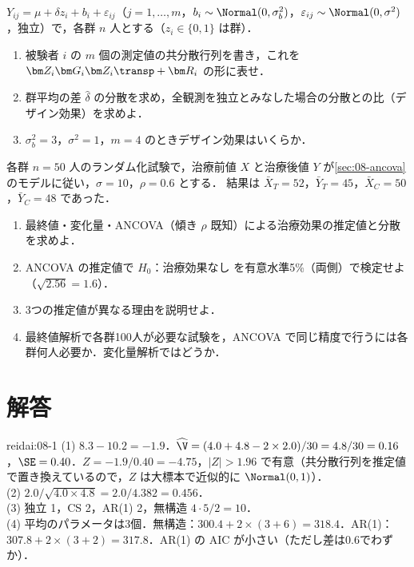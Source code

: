 \begin{reidai}[変量切片モデル]\label{reidai:08-2}
$Y_{ij}=\mu+\delta z_i+b_i+\varepsilon_{ij}$（$j=1,\dots,m$，$b_i\sim\Normal(0,\sigma_b^2)$，$\varepsilon_{ij}\sim\Normal(0,\sigma^2)$，独立）で，各群 $n$ 人とする（$z_i\in\{0,1\}$ は群）．
\begin{enumerate}[label=(\arabic*)]
\item 被験者 $i$ の $m$ 個の測定値の共分散行列を書き，これを $\bm Z_i\bm G_i\bm Z_i\transp+\bm R_i$ の形に表せ．
\item 群平均の差 $\hat\delta$ の分散を求め，全観測を独立とみなした場合の分散との比（デザイン効果）を求めよ．
\item $\sigma_b^2=3$，$\sigma^2=1$，$m=4$ のときデザイン効果はいくらか．
\end{enumerate}
\end{reidai}

\begin{reidai}[ベースライン調整]\label{reidai:08-3}
各群 $n=50$ 人のランダム化試験で，治療前値 $X$ と治療後値 $Y$ が\cref{sec:08-ancova}のモデルに従い，$\sigma=10$，$\rho=0.6$ とする．
結果は $\bar X_T=52$，$\bar Y_T=45$，$\bar X_C=50$，$\bar Y_C=48$ であった．
\begin{enumerate}[label=(\arabic*)]
\item 最終値・変化量・ANCOVA（傾き $\rho$ 既知）による治療効果の推定値と分散を求めよ．
\item ANCOVA の推定値で $H_0$：治療効果なし を有意水準5\%（両側）で検定せよ（$\sqrt{2.56}=1.6$）．
\item 3つの推定値が異なる理由を説明せよ．
\item 最終値解析で各群100人が必要な試験を，ANCOVA で同じ精度で行うには各群何人必要か．変化量解析ではどうか．
\end{enumerate}
\end{reidai}

\section{解答}\label{sec:08-sol}
\begin{kaitou}{reidai:08-1}
(1) $8.3-10.2=-1.9$．$\widehat\V=(4.0+4.8-2\times2.0)/30=4.8/30=0.16$，$\SE=0.40$．$Z=-1.9/0.40=-4.75$，$|Z|>1.96$ で有意（共分散行列を推定値で置き換えているので，$Z$ は大標本で近似的に $\Normal(0,1)$）．\\
(2) $2.0/\sqrt{4.0\times4.8}=2.0/4.382=0.456$．\\
(3) 独立 1，CS 2，AR(1) 2，無構造 $4\cdot5/2=10$．\\
(4) 平均のパラメータは3個．無構造：$300.4+2\times(3+6)=318.4$．AR(1)：$307.8+2\times(3+2)=317.8$．AR(1) の AIC が小さい（ただし差は0.6でわずか）．
\end{kaitou}

